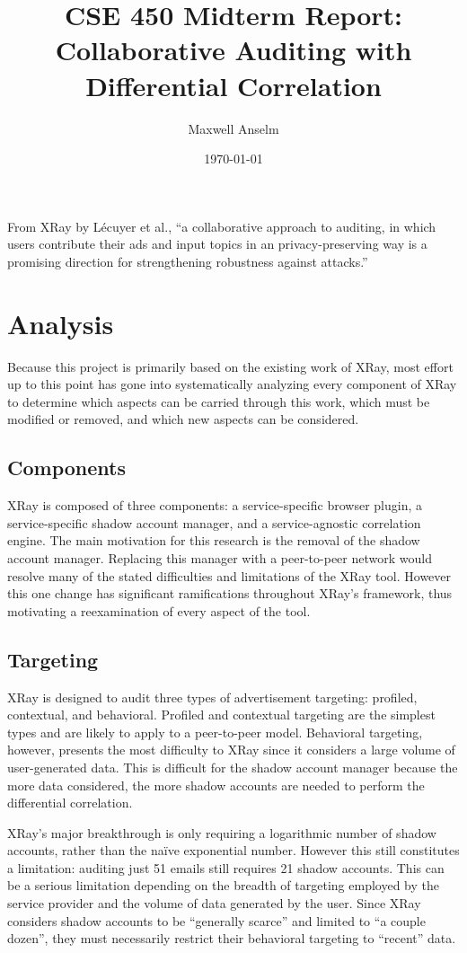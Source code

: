 \documentclass[12pt]{article}
\title{CSE 450 Midterm Report:\\
Collaborative Auditing with Differential Correlation}
\author{Maxwell Anselm}
\date{\today}
\begin{document}
\maketitle

From XRay by L\'ecuyer et al., ``a collaborative approach to auditing, in which
users contribute their ads and input topics in an privacy-preserving way is a
promising direction for strengthening robustness against attacks.''

\section{Analysis}

Because this project is primarily based on the existing work of XRay, most
effort up to this point has gone into systematically analyzing every component
of XRay to determine which aspects can be carried through this work, which
must be modified or removed, and which new aspects can be considered.

\subsection{Components}

XRay is composed of three components: a service-specific browser plugin, a
service-specific shadow account manager, and a service-agnostic correlation
engine. The main motivation for this research is the removal of the shadow
account manager. Replacing this manager with a peer-to-peer network would
resolve many of the stated difficulties and limitations of the XRay tool.
However this one change has significant ramifications throughout XRay's
framework, thus motivating a reexamination of every aspect of the tool.

\subsection{Targeting}

XRay is designed to audit three types of advertisement targeting: profiled,
contextual, and behavioral. Profiled and contextual targeting are the simplest
types and are likely to apply to a peer-to-peer model. Behavioral targeting,
however, presents the most difficulty to XRay since it considers a large volume
of user-generated data. This is difficult for the shadow account manager
because the more data considered, the more shadow accounts are needed to
perform the differential correlation.

XRay's major breakthrough is only requiring a logarithmic number of shadow
accounts, rather than the na\"ive exponential number. However this still
constitutes a limitation: auditing just 51 emails still requires 21 shadow
accounts. This can be a serious limitation depending on the breadth of targeting
employed by the service provider and the volume of data generated by the user.
Since XRay considers shadow accounts to be ``generally scarce'' and limited to
``a couple dozen'', they must necessarily restrict their behavioral targeting to
``recent'' data.
\end{document}
